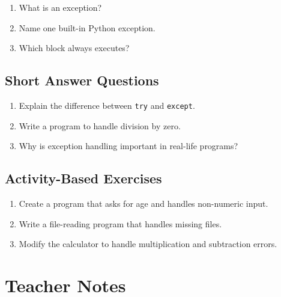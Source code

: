 \begin{enumerate}
    \item What is an exception?
    \item Name one built-in Python exception.
    \item Which block always executes?
\end{enumerate}

\subsection{Short Answer Questions}

\begin{enumerate}
    \item Explain the difference between \texttt{try} and \texttt{except}.
    \item Write a program to handle division by zero.
    \item Why is exception handling important in real-life programs?
\end{enumerate}

\subsection{Activity-Based Exercises}

\begin{enumerate}
    \item Create a program that asks for age and handles non-numeric input.
    \item Write a file-reading program that handles missing files.
    \item Modify the calculator to handle multiplication and subtraction errors.
\end{enumerate}

\section{Teacher Notes}


